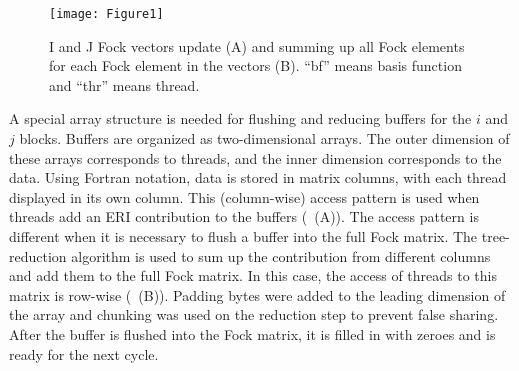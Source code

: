 \begin{figure}
	\texttt{[image: Figure1]}
	\caption{I and J Fock vectors update (A) and summing up all Fock elements for each Fock element in the vectors (B).
    		 ``bf'' means basis function and ``thr'' means thread.}
    \label{fig:buffer}
\end{figure}

A special array structure is needed for flushing and reducing buffers for the $i$ and $j$ blocks. Buffers are organized as two-dimensional arrays. The outer dimension of these arrays corresponds to threads, and the inner dimension corresponds to the data. Using Fortran notation, data is stored in matrix columns, with each thread displayed in its own column. This (column-wise) access pattern is used when threads add an ERI contribution to the buffers (~(A)). The access pattern is different when it is necessary to flush a buffer into the full Fock matrix. The tree-reduction algorithm is used to sum up the contribution from different columns and add them to the full Fock matrix. In this case, the access of threads to this matrix is row-wise (~(B)). Padding bytes were added to the leading dimension of the array and chunking was used on the reduction step to prevent false sharing. After the buffer is flushed into the Fock matrix, it is filled in with zeroes and is ready for the next cycle.